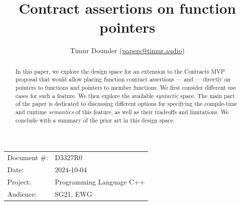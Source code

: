 

 \usepackage[bottom]{footmisc} 

 \usepackage{longtable}


\usepackage{tikz,lipsum,lmodern}
\usepackage[most]{tcolorbox}



\usepackage{titlesec}
\usepackage{tocloft}


\newcommand{\changelocaltocdepth}[1]{%
  \addtocontents{toc}{\protect\setcounter{tocdepth}{#1}}%
  \setcounter{tocdepth}{#1}%
}

\setcounter{tocdepth}{3}



\title{Contract assertions on function pointers}
\author{ Timur Doumler \small(\href{mailto:papers@timur.audio}{papers@timur.audio}) 
}
\date{}
\maketitle

\begin{tabular}{ll}
Document \#: & D3327R0 \\
Date: &2024-10-04 \\
Project: & Programming Language C++ \\
Audience: & SG21, EWG
\end{tabular}

\begin{abstract}
In this paper, we explore the design space for an extension to the Contracts MVP proposal \cite{P2900R8} that would allow placing function contract assertions ---  and  --- directly on pointers to functions and pointers to member functions. We first consider different use cases for such a feature. We then explore the available \emph{syntactic} space. The main part of the paper is dedicated to discussing different options for specifying the compile-time and runtime \emph{semantics} of this feature, as well as their tradeoffs and limitations. We conclude with a summary of the prior art in this design space.
\end{abstract}

